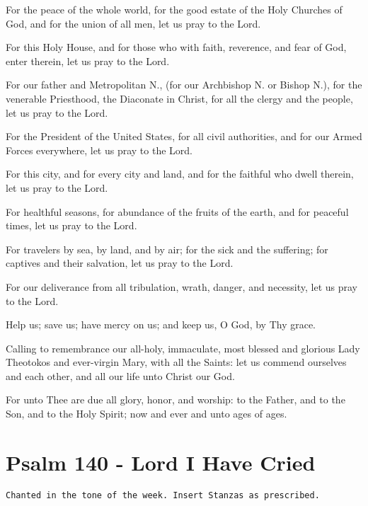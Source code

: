 \documentclass[twoside, letterpaper, 12pt]{report}
\newcommand{\instruction}[1]{%
  \texttt{\scriptsize{#1}}%
}
\newcommand{\centeredsection}[1]{%
  \needspace{10\baselineskip}%
  \section*{\centering{}#1}%
}
\begin{document}
\begin{deacon}
\item For the peace of the whole world, for the good estate of the Holy Churches of God,
    and for the union of all men, let us pray to the Lord.
\item For this Holy House, and for those who with faith, reverence, and fear of God,
    enter therein, let us pray to the Lord.
\item For our father and Metropolitan N., (for our Archbishop N. or Bishop N.),
    for the venerable Priesthood, the Diaconate in Christ,
    for all the clergy and the people, let us pray to the Lord.
\item  For the President of the United States, for all civil authorities,
    and for our Armed Forces everywhere, let us pray to the Lord.
\item For this city, and for every city and land, and for the faithful who dwell
    therein, let us pray to the Lord.
\item For healthful seasons, for abundance of the fruits of the earth,
    and for peaceful times, let us pray to the Lord.
\item For travelers by sea, by land, and by air; for the sick and the suffering;
    for captives and their salvation, let us pray to the Lord.
\item For our deliverance from all tribulation, wrath, danger, and necessity,
    let us pray to the Lord.
\item  Help us; save us; have mercy on us; and keep us, O God, by Thy grace.
\item Calling to remembrance our all-holy, immaculate, most blessed and glorious Lady
    Theotokos and ever-virgin Mary, with all the Saints: let us commend ourselves and
    each other, and all our life unto Christ our God.
\end{deacon}


\begin{priest}
\item For unto Thee are due all glory, honor, and worship: to the Father,
    and to the Son, and to the Holy Spirit; now and ever and unto ages of ages.
\end{priest}


\centeredsection{Psalm 140 - Lord I Have Cried}
\instruction{Chanted in the tone of the week. Insert Stanzas as prescribed.}
\end{document}
